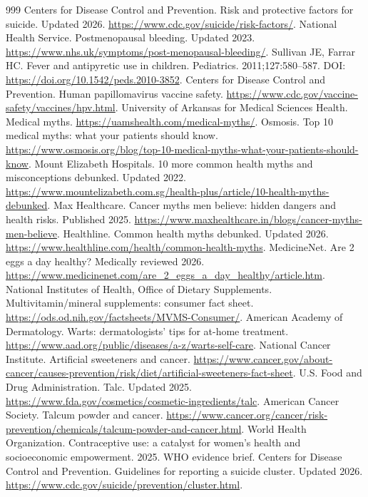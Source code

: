 \documentclass[11pt,oneside]{book}
\begin{document}
\begin{thebibliography}{999}
Centers for Disease Control and Prevention. Risk and protective factors for suicide. Updated 2026. \url{https://www.cdc.gov/suicide/risk-factors/}.
National Health Service. Postmenopausal bleeding. Updated 2023. \url{https://www.nhs.uk/symptoms/post-menopausal-bleeding/}.
Sullivan JE, Farrar HC. Fever and antipyretic use in children. Pediatrics. 2011;127:580--587. DOI: \url{https://doi.org/10.1542/peds.2010-3852}.
Centers for Disease Control and Prevention. Human papillomavirus vaccine safety. \url{https://www.cdc.gov/vaccine-safety/vaccines/hpv.html}.
University of Arkansas for Medical Sciences Health. Medical myths. \url{https://uamshealth.com/medical-myths/}.
Osmosis. Top 10 medical myths: what your patients should know. \url{https://www.osmosis.org/blog/top-10-medical-myths-what-your-patients-should-know}.
Mount Elizabeth Hospitals. 10 more common health myths and misconceptions debunked. Updated 2022. \url{https://www.mountelizabeth.com.sg/health-plus/article/10-health-myths-debunked}.
Max Healthcare. Cancer myths men believe: hidden dangers and health risks. Published 2025. \url{https://www.maxhealthcare.in/blogs/cancer-myths-men-believe}.
Healthline. Common health myths debunked. Updated 2026. \url{https://www.healthline.com/health/common-health-myths}.
MedicineNet. Are 2 eggs a day healthy? Medically reviewed 2026. \url{https://www.medicinenet.com/are_2_eggs_a_day_healthy/article.htm}.
National Institutes of Health, Office of Dietary Supplements. Multivitamin/mineral supplements: consumer fact sheet. \url{https://ods.od.nih.gov/factsheets/MVMS-Consumer/}.
American Academy of Dermatology. Warts: dermatologists' tips for at-home treatment. \url{https://www.aad.org/public/diseases/a-z/warts-self-care}.
National Cancer Institute. Artificial sweeteners and cancer. \url{https://www.cancer.gov/about-cancer/causes-prevention/risk/diet/artificial-sweeteners-fact-sheet}.
U.S. Food and Drug Administration. Talc. Updated 2025. \url{https://www.fda.gov/cosmetics/cosmetic-ingredients/talc}.
American Cancer Society. Talcum powder and cancer. \url{https://www.cancer.org/cancer/risk-prevention/chemicals/talcum-powder-and-cancer.html}.
World Health Organization. Contraceptive use: a catalyst for women's health and socioeconomic empowerment. 2025. WHO evidence brief.
Centers for Disease Control and Prevention. Guidelines for reporting a suicide cluster. Updated 2026. \url{https://www.cdc.gov/suicide/prevention/cluster.html}.

\end{thebibliography}
\end{document}
